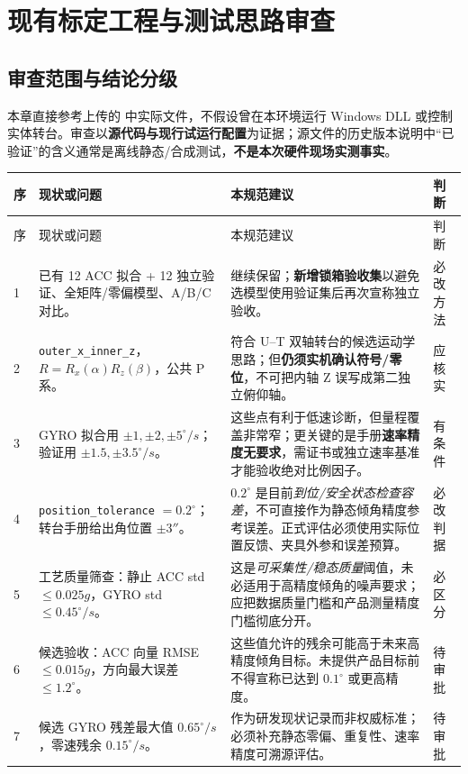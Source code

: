 \section{现有标定工程与测试思路审查}
\subsection{审查范围与结论分级}
本章直接参考上传的  中实际文件，不假设曾在本环境运行 Windows DLL 或控制实体转台。审查以\textbf{源代码与现行试运行配置}为证据；源文件的历史版本说明中“已验证”的含义通常是离线静态/合成测试，\textbf{不是本次硬件现场实测事实}。

\begin{longtable}{C{9mm}p{46mm}p{70mm}p{22mm}}
\toprule
序 & 现状或问题 & 本规范建议 & 判断\\\midrule\endfirsthead
\toprule 序 & 现状或问题 & 本规范建议 & 判断\\\midrule{} & 已有 12 ACC 拟合 + 12 独立验证、全矩阵/零偏模型、A/B/C 对比。 & 继续保留；\textbf{新增锁箱验收集}以避免选模型使用验证集后再次宣称独立验收。 & 必改方法\\
2 & \texttt{outer\_x\_inner\_z}，$R=R_x(\alpha)R_z(\beta)$，公共 P 系。 & 符合 U--T 双轴转台的候选运动学思路；但\textbf{仍须实机确认符号/零位}，不可把内轴 Z 误写成第二独立俯仰轴。 & 应核实\\
3 & GYRO 拟合用 $\pm1,\pm2,\pm5^\circ/s$；验证用 $\pm1.5,\pm3.5^\circ/s$。 & 这些点有利于低速诊断，但量程覆盖非常窄；更关键的是手册\textbf{速率精度无要求}，需证书或独立速率基准才能验收绝对比例因子。 & 有条件\\
4 & \texttt{position\_tolerance} $=0.2^\circ$；转台手册给出角位置 $\pm3''$。 & $0.2^\circ$ 是目前\emph{到位/安全状态检查容差}，不可直接作为静态倾角精度参考误差。正式评估必须使用实际位置反馈、夹具外参和误差预算。 & 必改判据\\
5 & 工艺质量筛查：静止 ACC std $\le0.025g$，GYRO std $\le0.45^\circ/s$。 & 这是\emph{可采集性/稳态质量}阈值，未必适用于高精度倾角的噪声要求；应把数据质量门槛和产品测量精度门槛彻底分开。 & 必区分\\
6 & 候选验收：ACC 向量 RMSE $\le0.015g$，方向最大误差 $\le1.2^\circ$。 & 这些值允许的残余可能高于未来高精度倾角目标。未提供产品目标前不得宣称已达到 $0.1^\circ$ 或更高精度。 & 待审批\\
7 & 候选 GYRO 残差最大值 $0.65^\circ/s$，零速残余 $0.15^\circ/s$。 & 作为研发现状记录而非权威标准；必须补充静态零偏、重复性、速率精度可溯源评估。 & 待审批\\

\end{longtable}
